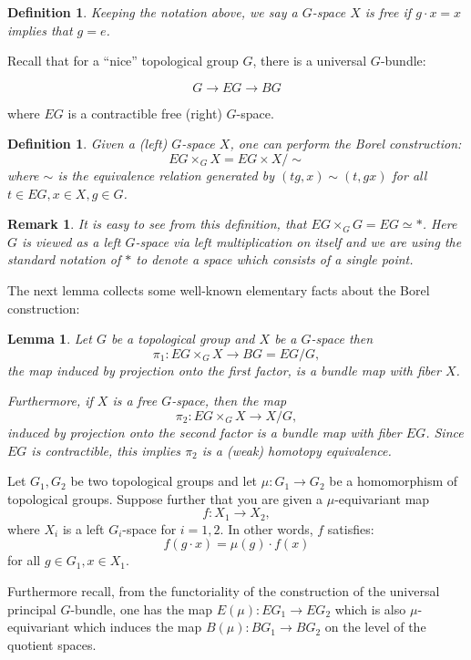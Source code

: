 \documentclass{amsart}
\newtheorem{lem}[thm]{Lemma}
\newtheorem{rem}[thm]{Remark}
\newtheorem{defn}[thm]{Definition}
\begin{document}
\begin{defn}
Keeping the notation above, we say a $G$-space $X$ is free if 
$g \cdot x = x$ implies that $g=e$.
\end{defn}

Recall that for a
``nice'' topological group $G$, there is a universal $G$-bundle:

$$
G \rightarrow EG \rightarrow BG
$$

where $EG$ is a contractible free (right) $G$-space.

\begin{defn}
Given a (left) $G$-space $X$, one can perform the 
Borel construction:
$$
EG \times_G X = EG \times X / \sim
$$
where $\sim$ is the equivalence relation generated by
$ (tg,x) \sim (t,gx) $ for all $t \in EG, x \in X, g \in G$. 
\end{defn}

\begin{rem}
\label{rem: basborel}
It is easy to see from this definition, that
$EG \times_G G = EG \simeq *$.
Here $G$ is viewed as a left $G$-space via left multiplication on
itself and we are using the standard notation of $*$ to denote
a space which consists of a single point. 
\end{rem}

The next lemma collects some well-known elementary facts about
the Borel construction:

\begin{lem}
Let $G$ be a topological group and $X$ be a $G$-space
then 
$$
\pi_1: EG \times_G X \rightarrow BG=EG/G,
$$ 
the map induced
by projection onto the first factor, is a bundle
map with fiber $X$.

Furthermore, if $X$ is a free $G$-space, then the map
$$
\pi_2: EG \times_G X \rightarrow X/G,
$$ 
induced by projection
onto the second factor is a bundle map with fiber $EG$. Since
$EG$ is contractible, this implies $\pi_2$ is a (weak) homotopy equivalence.
\end{lem}

Let $G_1,G_2$ be two topological groups and let 
$\mu : G_1 \rightarrow G_2$ be a homomorphism of topological groups.
Suppose further that you are given a $\mu$-equivariant map 
$$
f: X_1 \rightarrow X_2,
$$
where $X_i$ is a left $G_i$-space for $i=1,2$. In other words, $f$
satisfies:
$$
f(g \cdot x) = \mu(g) \cdot f(x)
$$ 
for all $g \in G_1, x \in X_1$.

Furthermore recall, from the functoriality of the construction of the
universal principal $G$-bundle, one has the map 
$E(\mu): EG_1 \rightarrow EG_2$
which is also $\mu$-equivariant which induces the map 
$B(\mu): BG_1 \rightarrow BG_2$ on the level of the quotient spaces.
\end{document}
